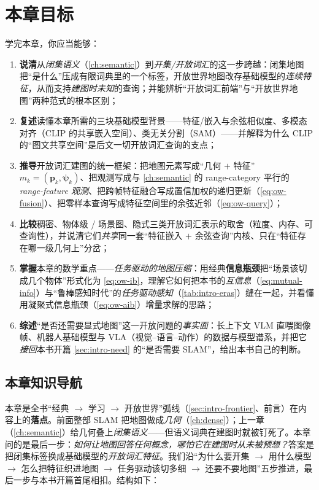\section*{本章目标}
学完本章，你应当能够：
\begin{enumerate}
  \item \textbf{说清}从\emph{闭集语义}（\cref{ch:semantic}）到\emph{开集/开放词汇}的这一步跨越：闭集地图把“是什么”压成有限词典里的一个标签，开放世界地图改存基础模型的\emph{连续特征}，从而支持\emph{建图时未知}的查询；并能辨析“开放词汇前端”与“开放世界地图”两种范式的根本区别；
  \item \textbf{复述}读懂本章所需的三块基础模型背景——特征/嵌入与余弦相似度、多模态对齐（CLIP 的共享嵌入空间）、类无关分割（SAM）——并解释为什么 CLIP 的“图文共享空间”是后文一切开放词汇查询的支点；
  \item \textbf{推导}开放词汇建图的统一框架：把地图元素写成“几何 $+$ 特征” $m_k=(\mathbf{p}_k,\boldsymbol\psi_k)$、把观测写成与 \cref{ch:semantic} 的 range-category 平行的 \emph{range-feature 观测}、把跨帧特征融合写成置信加权的递归更新（\cref{eq:ow-fusion}）、把零样本查询写成特征空间里的余弦近邻（\cref{eq:ow-query}）；
  \item \textbf{比较}稠密、物体级 / 场景图、隐式三类开放词汇表示的取舍（粒度、内存、可查询性），并说清它们\emph{共享}同一套“特征嵌入 $+$ 余弦查询”内核、只在“特征存在哪一级几何上”分岔；
  \item \textbf{掌握}本章的数学重点——\emph{任务驱动的地图压缩}：用经典\textbf{信息瓶颈}把“场景该切成几个物体”形式化为 \cref{eq:ow-ib}，理解它如何把本书的\emph{互信息}（\cref{eq:mutual-info}）与“鲁棒感知时代”的\emph{任务驱动感知}（\cref{tab:intro-eras}）缝在一起，并看懂用凝聚式信息瓶颈（\cref{eq:ow-aib}）增量求解的思路；
  \item \textbf{综述}“是否还需要显式地图”这一开放问题的\emph{事实面}：长上下文 VLM 直喂图像帧、机器人基础模型与 VLA（视觉–语言–动作）的数据与模型谱系，并把它\emph{接回}本书开篇 \cref{sec:intro-need} 的“是否需要 SLAM”，给出本书自己的判断。
\end{enumerate}

\subsection*{本章知识导航}
本章是全书“经典 $\to$ 学习 $\to$ 开放世界”弧线（\cref{sec:intro-frontier}、前言）在内容上的\textbf{落点}。前面整部 SLAM 把地图做成\emph{几何}（\cref{ch:dense}）；上一章（\cref{ch:semantic}）给几何叠上\emph{闭集语义}——但语义词典在建图时就被钉死了。本章问的是最后一步：\emph{如何让地图回答任何概念，哪怕它在建图时从未被预想？}答案是把闭集标签换成基础模型的\emph{开放词汇特征}。我们沿“为什么要开集 $\to$ 用什么模型 $\to$ 怎么把特征织进地图 $\to$ 任务驱动该切多细 $\to$ 还要不要地图”五步推进，最后一步与本书开篇首尾相扣。结构如下：

